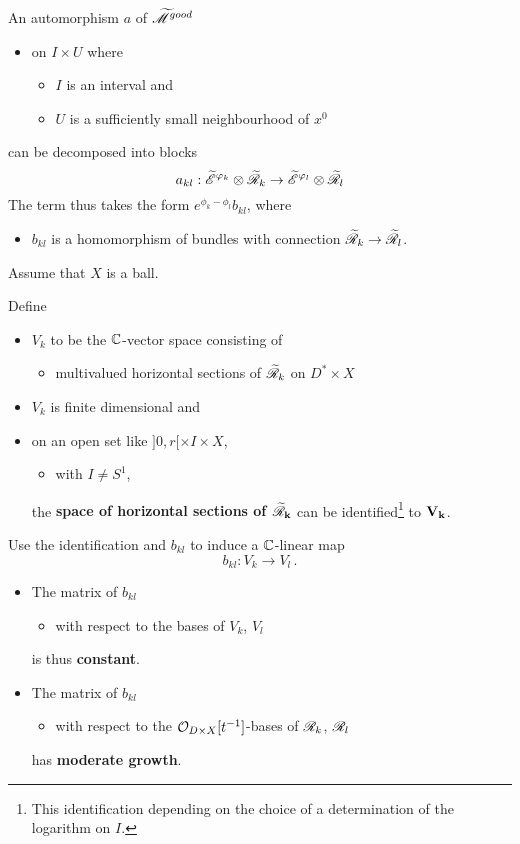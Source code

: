 An automorphism $a$ of $\widetilde{\mathscr{M}}^{good}$
\begin{itemize}
  \item on $I\times U$ where
    \begin{itemize}
      \item $I$ is an interval and
      \item $U$ is a sufficiently small neighbourhood of $x^0$
    \end{itemize}
\end{itemize}
can be decomposed into blocks
\[
  a_{kl}:\widetilde{\mathscr{E}}^{\varphi_k}\otimes\widetilde{\mathscr{R}}_k
    \to
    \widetilde{\mathscr{E}}^{\varphi_l}\otimes\widetilde{\mathscr{R}}_l 
\]
The term thus takes the form $e^{\phi_k-\phi_l}b_{kl}$, where
\begin{itemize}
  \item $b_{kl}$ is a homomorphism of bundles with connection 
    $\widetilde{\mathscr{R}}_k\to\widetilde{\mathscr{R}}_l$.
\end{itemize}
Assume that $X$ is a ball.
\begin{defn}
  Define
  \begin{itemize}
    \item $V_k$ to be the $\mathbb{C}$-vector space consisting of
      \begin{itemize}
        \item multivalued horizontal sections of $\widetilde{\mathscr{R}}_k$ on $D^*\times X$
      \end{itemize}
  \end{itemize}
  \begin{rem}
    \begin{itemize}
      \item $V_k$ is finite dimensional and
      \item on an open set like $]0,r[\times I\times X$,
        \begin{itemize}
          \item with $I\neq S^1$,
        \end{itemize}
        the \textbf{space of horizontal sections of $\bf\widetilde{\mathscr{R}}_k$}
        can be identified\footnote{This identification depending on the choice
        of a determination of the logarithm on $I$.} to \textbf{$\bf V_k$}.
    \end{itemize}
  \end{rem}
\end{defn}
Use the identification and $b_{kl}$ to induce a $\mathbb{C}$-linear map
\[
  b_{kl}:V_k\to V_l \,.
\]
\begin{rem}
  \begin{itemize}
    \item The matrix of $b_{kl}$
      \begin{itemize}
        \item with respect to the bases of $V_k$, $V_l$
      \end{itemize}
      is thus \textbf{constant}.
    \item The matrix of $b_{kl}$
      \begin{itemize}
        \item with respect to the $\mathcal{O}_{D\times X}[t^{-1}]$-bases of $\mathscr{R}_k$,
          $\mathscr{R}_l$
      \end{itemize}
      has \textbf{moderate growth}.
  \end{itemize}
\end{rem}
